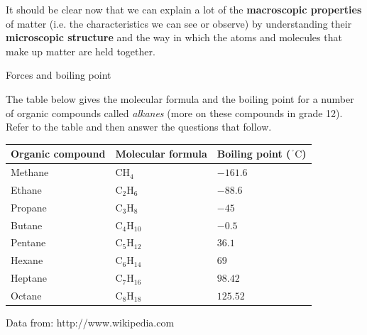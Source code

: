 \label{m38734*eip-473}It should be clear now that we can explain a lot of 
the \textbf{macroscopic properties} of matter (i.e. 
the characteristics we can see or observe) by understanding their \textbf{microscopic structure} and the way in which the atoms 
and molecules that make up matter are held together.\par \label{m38734*secfhsst!!!underscore!!!id289}
            \begin{exercises}{Forces and boiling point}{
            \nopagebreak
            \label{m38734*uid9732}The table below gives the molecular formula and the boiling point 
for a number of organic compounds called \textsl{alkanes} (more on these compounds in grade 12). Refer 
to the table and then answer the questions that follow.
          \begin{table}[H]
        \begin{center}
      \label{m38734*id309695}
      \begin{tabular}{|l|l|l|}\hline
\textbf{Organic compound} & \textbf{Molecular formula} & \textbf{Boiling point (${}^{\ensuremath{{\,}^{\circ}}}\mathrm{C}$)} \\ \hline
        Methane & ${\mathrm{CH}}_{4}$ & $-161.6$ \\ \hline
        Ethane & ${\mathrm{C}}_{2}{\mathrm{H}}_{6}$ & $-88.6$ \\ \hline
        Propane & ${\mathrm{C}}_{3}{\mathrm{H}}_{8}$ & $-45$ \\ \hline
        Butane & ${\mathrm{C}}_{4}{\mathrm{H}}_{10}$ & $-0.5$ \\ \hline
        Pentane & ${\mathrm{C}}_{5}{\mathrm{H}}_{12}$ & $36.1$ \\ \hline
        Hexane & ${\mathrm{C}}_{6}{\mathrm{H}}_{14}$ & $69$ \\ \hline
        Heptane & ${\mathrm{C}}_{7}{\mathrm{H}}_{16}$ & $98.42$ \\ \hline
        Octane & ${\mathrm{C}}_{8}{\mathrm{H}}_{18}$ & $125.52$ \\ \hline 
    \end{tabular}
      \end{center}
\end{table}
    \par
  Data from: http://www.wikipedia.com\label{m38734*id310184}\begin{enumerate}[noitemsep, label=\textbf{\arabic*}. ] 

\end{enumerate}}
\end{exercises}

